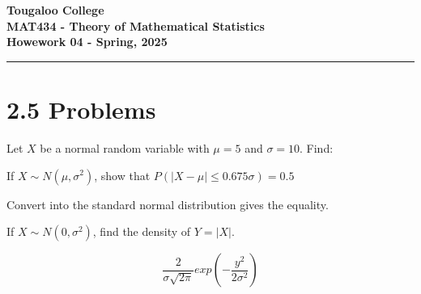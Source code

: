 \documentclass[12pt]{exam}
\newcommand{\paper}[5]{
    \setcounter{page}{1}
    
    \begin{minipage}{\textwidth}
    \Large{\textbf{Tougaloo College}}\\
    \textbf{#2}\\
    \textbf{#5 - #3}\\
    \end{minipage}
    \hfill
    
    \vspace{0.1in}
    \rule[1ex]{\textwidth}{2pt}
    }
\begin{document}
\paper{03//2025}{MAT434 - Theory of Mathematical Statistics}{Spring, 2025}{}{Howework 04}

\section*{2.5 Problems}
\begin{questions}



\question[]  Let \(X\) be a normal random variable with \(\mu =5\) and \(\sigma =10\). Find:

\question If \(X \sim N(\mu, \sigma^2)\), show that \(P(|X-\mu| \leq 0.675 \sigma)=0.5\)

\begin{solution}
    Convert into the standard normal distribution gives the equality. 
\end{solution}

\question If \(X \sim N(0,\sigma^2)\), find the density of \(Y=|X|\). 

\begin{solution}
    \[\dfrac{2}{\sigma \sqrt{2 \pi}}exp\left(-\dfrac{y^2}{2\sigma^2}\right)\]
\end{solution}



\end{questions}
\end{document}

